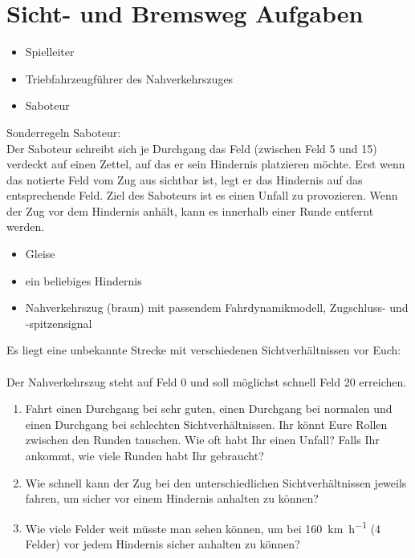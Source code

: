 

\section{Sicht- und Bremsweg Aufgaben}

  \roles
    \begin{itemize}
      \item Spielleiter
      \item Triebfahrzeugführer des Nahverkehrszuges
      \item Saboteur
    \end{itemize}
    Sonderregeln Saboteur:\\
    Der Saboteur schreibt sich je Durchgang das Feld (zwischen Feld 5 und 15) verdeckt auf einen Zettel, auf das er sein Hindernis platzieren möchte. Erst wenn das notierte Feld vom Zug aus sichtbar ist, legt er das Hindernis auf das entsprechende Feld. Ziel des Saboteurs ist es einen Unfall zu provozieren. Wenn der Zug vor dem Hindernis anhält, kann es innerhalb einer Runde entfernt werden.


  \material
    \begin{itemize}
      \item Gleise
      \item ein beliebiges Hindernis
      \item Nahverkehrszug (braun) mit passendem Fahrdynamikmodell, Zugschluss- und -spitzensignal
    \end{itemize}

  \setup
    Es liegt eine unbekannte Strecke mit verschiedenen Sichtverhältnissen vor Euch:\\
    \\
     Der Nahverkehrszug steht auf Feld 0 und soll möglichst schnell Feld 20 erreichen.

  \task
    \begin{enumerate}[label=\alph*)]
      \item Fahrt einen Durchgang bei sehr guten, einen Durchgang bei normalen und einen Durchgang bei schlechten Sichtverhältnissen. Ihr könnt Eure Rollen zwischen den Runden tauschen. Wie oft habt Ihr einen Unfall? Falls Ihr ankommt, wie viele Runden habt Ihr gebraucht?
      \item Wie schnell kann der Zug bei den unterschiedlichen Sichtverhältnissen jeweils fahren, um sicher vor einem Hindernis anhalten zu können?
      \item Wie viele Felder weit müsste man sehen können, um bei \SI{160}{\kilo\metre\per\hour} (4 Felder) vor jedem Hindernis sicher anhalten zu können?
    \end{enumerate}
